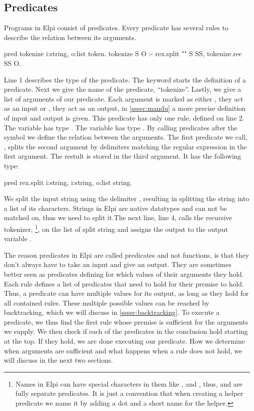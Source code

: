 \documentclass[thesis.tex]{subfiles}
\begin{document}
{{\subsection{Predicates} \label{sssec:predicates}
Programs in Elpi consist of predicates. Every predicate has several rules to describe the relation between its arguments.
\begin{elpicode}
  pred tokenize i:string, o:list token.
  tokenize S O :- 
    rex.split "" S SS,
    tokenize.rec SS O.
\end{elpicode}
Line 1 describes the type of the predicate. The keyword  starts the definition of a predicate. Next we give the name of the predicate, ``tokenize''. Lastly, we give a list of arguments of our predicate. Each argument is marked as either , they act as an input or , they act as an output, in \cref{sssec:mandu} a more precise definition of input and output is given. This predicate has only one rule, defined on line 2. The variable  has type . The variable  has type . By calling predicates after the \elpii{:-} symbol we define the relation between the arguments. The first predicate we call, , splits the second argument by delimiters matching the regular expression in the first argument. The restult is stored in the third argument. It has the following type:
\begin{elpicode}
  pred rex.split i:string, i:string, o:list string.
\end{elpicode}
We split the input string using the delimiter , resulting in splitting the string into a list of its characters. Strings in Elpi are native datatypes and can not be matched on, thus we need to split it.The next line, line 4, calls the recursive tokenizer, \footnote{Names in Elpi can have special characters in them like , \elpii{-} and \elpii{>}, thus,  and  are fully separate predicates. It is just a convention that when creating a helper predicate we name it by adding a dot and a short name for the helper.}, on the list of split string and assigns the output to the output variable .

The reason predicates in Elpi are called predicates and not functions, is that they don't always have to take an input and give an output. They are sometimes better seen as predicates defining for which values of their arguments they hold. Each rule defines a list of predicates that need to hold for their premise to hold. Thus, a predicate can have multiple values for its output, as long as they hold for all contained rules. These multiple possible values can be reached by backtracking, which we will discuss in \cref{sssec:backtracking}. To execute a predicate, we thus find the first rule whose premise is sufficient for the arguments we supply. We then check if each of the predicates in the conclusion hold starting at the top. If they hold, we are done executing our predicate. How we determine when arguments are sufficient and what happens when a rule does not hold, we will discuss in the next two sections.

}}
\end{document}
